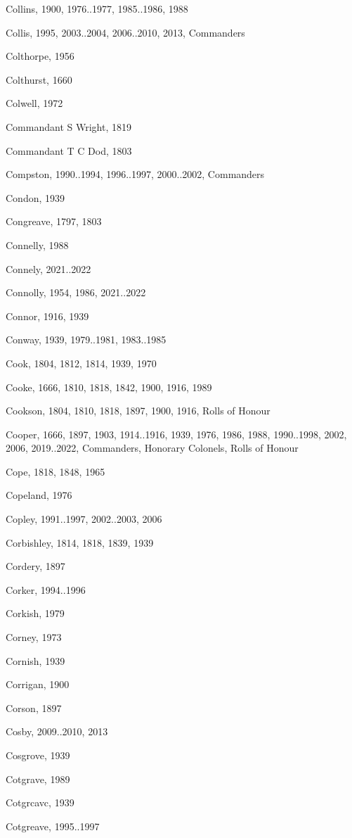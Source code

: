 {\begin{theindex}
\item Collins, 1900, 1976..1977, 1985..1986, 1988
\item Collis, 1995, 2003..2004, 2006..2010, 2013, Commanders
\item Colthorpe, 1956
\item Colthurst, 1660
\item Colwell, 1972
\item Commandant S Wright, 1819
\item Commandant T C Dod, 1803
\item Compston, 1990..1994, 1996..1997, 2000..2002, Commanders
\item Condon, 1939
\item Congreave, 1797, 1803
\item Connelly, 1988
\item Connely, 2021..2022
\item Connolly, 1954, 1986, 2021..2022
\item Connor, 1916, 1939
\item Conway, 1939, 1979..1981, 1983..1985
\item Cook, 1804, 1812, 1814, 1939, 1970
\item Cooke, 1666, 1810, 1818, 1842, 1900, 1916, 1989
\item Cookson, 1804, 1810, 1818, 1897, 1900, 1916, Rolls of Honour
\item Cooper, 1666, 1897, 1903, 1914..1916, 1939, 1976, 1986, 1988, 1990..1998, 2002, 2006, 2019..2022, Commanders, Honorary Colonels, Rolls of Honour
\item Cope, 1818, 1848, 1965
\item Copeland, 1976
\item Copley, 1991..1997, 2002..2003, 2006
\item Corbishley, 1814, 1818, 1839, 1939
\item Cordery, 1897
\item Corker, 1994..1996
\item Corkish, 1979
\item Corney, 1973
\item Cornish, 1939
\item Corrigan, 1900
\item Corson, 1897
\item Cosby, 2009..2010, 2013
\item Cosgrove, 1939
\item Cotgrave, 1989
\item Cotgrcavc, 1939
\item Cotgreave, 1995..1997

\end{theindex}}
